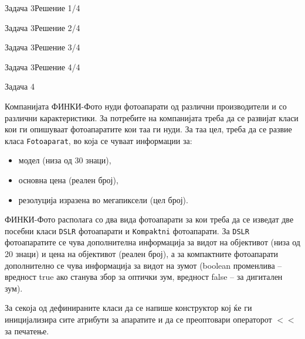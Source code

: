 \begin{frame}[fragile]{Задача 3}{Решение 1/4}

\end{frame}

\begin{frame}[fragile]{Задача 3}{Решение 2/4}

\end{frame}

\begin{frame}[fragile]{Задача 3}{Решение 3/4}

\end{frame}

\begin{frame}[fragile]{Задача 3}{Решение 4/4}

\end{frame}

\begin{frame}{Задача 4}
\begin{scriptsize}
Компанијата ФИНКИ-Фото нуди фотоапарати од различни производители и со различни
карактеристики. За потребите на компанијата треба да се развијат класи кои ги
опишуваат фотоапаратите кои таа ги нуди. За таа цел, треба да се развие класа
\texttt{Fotoaparat}, во која се чуваат информации за:
\begin{itemize}
  \item модел (низа од 30 знаци),
  \item основна цена (реален број),
  \item резолуција изразена во мегапиксели (цел број).
\end{itemize}

ФИНКИ-Фото располага со два вида фотоапарати за кои треба да се изведат две
посебни класи \texttt{DSLR} фотоапарати и \texttt{Kompaktni} фотоапарати. За
\texttt{DSLR} фотоапаратите се чува дополнителна информација за видот на
објективот (низа од 20 знаци) и цена на објективот (реален број), а за
компактните фотоапарати дополнително се чува информација за видот на зумот
(boolean променлива – вредност true ако станува збор за оптички зум, вредност
false – за дигитален зум). 

За секоја од дефинираните класи да се напише конструктор кој ќе ги иницијализира
сите атрибути за апаратите и да се преоптовари операторот $<<$ за печатење.

\end{scriptsize}
\end{frame}

